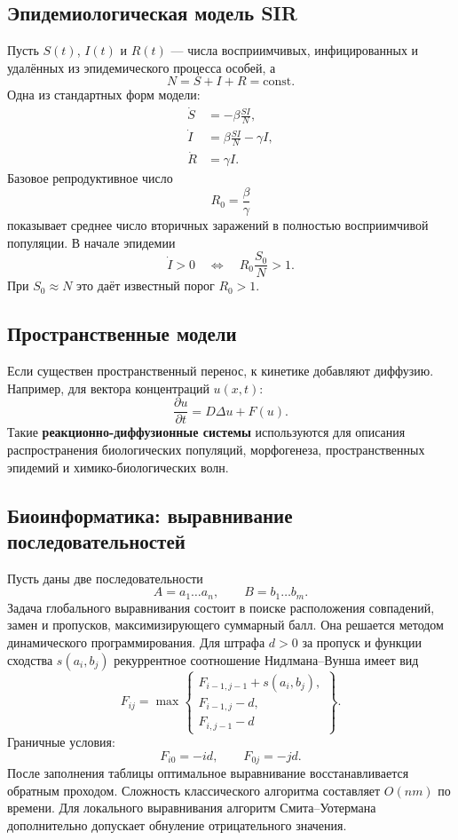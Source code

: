 \subsection{Эпидемиологическая модель SIR}

Пусть $S(t)$, $I(t)$ и $R(t)$ --- числа восприимчивых, инфицированных и
удалённых из эпидемического процесса особей, а
\[
N=S+I+R=\text{const}.
\]
Одна из стандартных форм модели:
\[
\boxed{
\begin{aligned}
\dot S&=-\beta\frac{SI}{N},\\
\dot I&=\beta\frac{SI}{N}-\gamma I,\\
\dot R&=\gamma I.
\end{aligned}
}
\]
Базовое репродуктивное число
\[
\boxed{R_0=\frac{\beta}{\gamma}}
\]
показывает среднее число вторичных заражений в полностью восприимчивой
популяции. В начале эпидемии
\[
\dot I>0
\quad\Longleftrightarrow\quad
R_0\frac{S_0}{N}>1.
\]
При $S_0\approx N$ это даёт известный порог $R_0>1$.

\subsection{Пространственные модели}

Если существен пространственный перенос, к кинетике добавляют диффузию.
Например, для вектора концентраций $u(x,t)$:
\[
\frac{\partial u}{\partial t}
=D\Delta u+F(u).
\]
Такие \textbf{реакционно-диффузионные системы} используются для описания
распространения биологических популяций, морфогенеза, пространственных
эпидемий и химико-биологических волн.

\subsection{Биоинформатика: выравнивание последовательностей}

Пусть даны две последовательности
\[
A=a_1\ldots a_n,
\qquad
B=b_1\ldots b_m.
\]
Задача глобального выравнивания состоит в поиске расположения совпадений,
замен и пропусков, максимизирующего суммарный балл. Она решается методом
динамического программирования. Для штрафа $d>0$ за пропуск и функции
сходства $s(a_i,b_j)$ рекуррентное соотношение Нидлмана--Вунша имеет вид
\[
\boxed{
F_{ij}=\max\left\{
\begin{array}{l}
F_{i-1,j-1}+s(a_i,b_j),\\
F_{i-1,j}-d,\\
F_{i,j-1}-d
\end{array}
\right\}.
}
\]
Граничные условия:
\[
F_{i0}=-id,
\qquad
F_{0j}=-jd.
\]
После заполнения таблицы оптимальное выравнивание восстанавливается
обратным проходом. Сложность классического алгоритма составляет
$O(nm)$ по времени. Для локального выравнивания алгоритм Смита--Уотермана
дополнительно допускает обнуление отрицательного значения.

